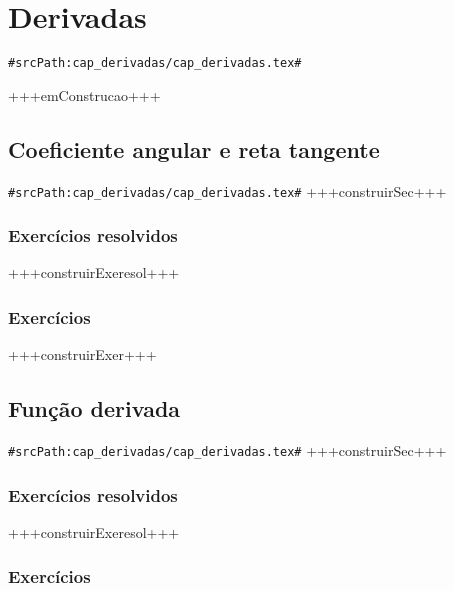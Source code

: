 
\chapter{Derivadas}
\verb+#srcPath:cap_derivadas/cap_derivadas.tex#+
\label{chap:derivadas}

+++emConstrucao+++


\section{Coeficiente angular e reta tangente}
\verb+#srcPath:cap_derivadas/cap_derivadas.tex#+
\label{sec:derivadas_coef_angular}
+++construirSec+++

\subsection*{Exercícios resolvidos}

+++construirExeresol+++


\subsection*{Exercícios}

+++construirExer+++


\section{Função derivada}
\verb+#srcPath:cap_derivadas/cap_derivadas.tex#+
+++construirSec+++

\subsection*{Exercícios resolvidos}

+++construirExeresol+++


\subsection*{Exercícios}

